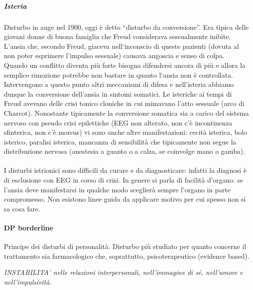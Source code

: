 \subparagraph{Isteria}

Disturbo in auge nel 1900, oggi è detto ``disturbo da conversione''. Era
tipica delle giovani donne di buona famiglia che Freud considerava
sessualmente inibite. L'ansia che, secondo Freud, giaceva nell`inconscio
di queste pazienti (dovuta al non poter esprimere l'impulso sessuale)
causava angoscia e senso di colpa. Quando un conflitto diventa più forte
bisogna difendersi ancora di più e allora la semplice rimozione potrebbe
non bastare in quanto l`ansia non è controllata. Intervengono a questo
punto altri meccanismi di difesa e nell'isteria abbiamo dunque la
conversione dell'ansia in sintomi somatici. Le isteriche ai tempi di
Freud avevano delle crisi tonico cloniche in cui mimavano l'atto
sessuale (arco di Charcot). Nonostante tipicamente la conversione
somatica sia a carico del sistema nervoso con pseudo crisi epilettiche
(EEG non alterato, non c'è incontinenza sfinterica, non c'è morsus) vi
sono anche altre manifestazioni: cecità isterica, bolo isterico,
paralisi isterica, mancanza di sensibilità che tipicamente non segue la
distribuzione nervosa (anestesia a guanto o a calza, se coinvolge mano o
gamba).
\\\\
I disturbi istrionici sono difficili da curare e da diagnosticare:
infatti la diagnosi è di esclusione con EEG in corso di crisi. In genere
si parla di facilità d'organo: se l'ansia deve manifestarsi in qualche
modo sceglierà sempre l'organo in parte compromesso. Non esistono linee
guida da applicare motivo per cui spesso non si sa cosa fare.

\paragraph{DP borderline}

Principe dei disturbi di personalità. Disturbo più studiato per quanto
concerne il trattamento sia farmacologico che, soprattutto,
psicoterapeutico (evidence based).

\emph{INSTABILITA' nelle relazioni interpersonali, nell'immagine di sé,
nell'umore e nell'impulsività.}

